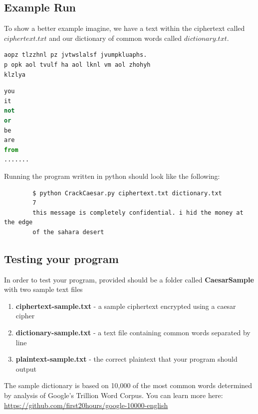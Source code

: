 \documentclass{article}
\begin{document}
\subsection{Example Run}
To show a better example imagine, we have a text within the ciphertext called $ciphertext.txt$ and our dictionary of common words called $dictionary.txt$.

\begin{file}
\begin{lstlisting}[language=Python]
aopz tlzzhnl pz jvtwslalsf jvumpkluaphs.
p opk aol tvulf ha aol lknl vm aol zhohyh
klzlya
\end{lstlisting}
\end{file}

\begin{file}
\begin{lstlisting}[language=Python]
you
it
not
or
be
are
from
.......
\end{lstlisting}
\end{file}

Running the program written in python should look like the following:

\begin{commandline}
	\begin{verbatim}
		$ python CrackCaesar.py ciphertext.txt dictionary.txt
		7
		this message is completely confidential. i hid the money at the edge
		of the sahara desert
	\end{verbatim}
\end{commandline}

\subsection{Testing your program}
In order to test your program, provided should be a folder called \textbf{CaesarSample} with two sample text files
\begin{enumerate}
\item \textbf{ciphertext-sample.txt} - a sample ciphertext encrypted using a caesar cipher
\item \textbf{dictionary-sample.txt} - a text file containing common words separated by line
\item \textbf{plaintext-sample.txt} - the correct plaintext that your program should output
\end{enumerate}

\begin{info}[Note:] %
The sample dictionary is based on 10,000 of the most common words determined by analysis of Google's Trillion Word Corpus. You can learn more here: \url{https://github.com/first20hours/google-10000-english}
\end{info}
\end{document}
